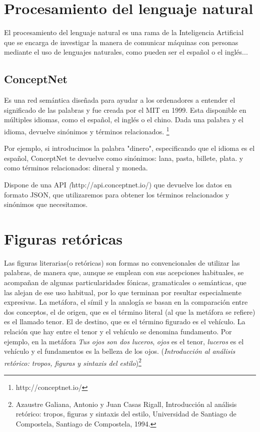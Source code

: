 \section{Procesamiento del lenguaje natural}
El procesamiento del lenguaje natural es una rama de la Inteligencia Artificial
que se encarga de investigar la manera de comunicar máquinas con personas mediante el uso de lenguajes naturales, como pueden ser el español o el inglés...

\subsection{ConceptNet} 

Es una red semántica diseñada para ayudar a los ordenadores a entender el significado de las palabras y fue creada por el MIT en 1999. Esta disponible en múltiples idiomas, como el español, el inglés o el chino.
Dada una palabra y el idioma, devuelve sinónimos y términos relacionados.
\footnote{http://conceptnet.io/}

Por ejemplo, si introducimos la palabra "dinero", especificando que el idioma es el español, ConceptNet te devuelve como sinónimos: lana, pasta, billete, plata. y como términos relacionados: dineral y moneda.

Dispone de una API \textit({http://api.conceptnet.io/}) que devuelve los datos en formato JSON, que utilizaremos para obtener los términos relacionados y sinónimos que necesitamos.

\section{Figuras retóricas}
Las figuras literarias(o retóricas) son formas no convencionales de utilizar las palabras, de manera que, aunque se emplean con sus acepciones habituales, se acompañan de algunas particularidades fónicas, gramaticales o semánticas, que las alejan de ese uso habitual, por lo que terminan por resultar especialmente expresivas. 
La metáfora, el símil y la analogía se basan en la comparación entre dos conceptos, el de origen, que es el término literal (al que la metáfora se refiere) es el llamado tenor. El de destino, que es el término figurado es el vehículo. La relación que hay entre el tenor y el vehículo se denomina fundamento. Por ejemplo, en la metáfora \textit{Tus ojos son dos luceros}, \textit{ojos} es el tenor, \textit{luceros} es el vehículo y el fundamentos es la belleza de los ojos.
(\textit {Introducción al análisis retórico: tropos, figuras y sintaxis del estilo})\footnote{Azaustre Galiana, Antonio y Juan Casas Rigall, Introducción al análisis retórico: tropos, figuras y sintaxis del estilo, Universidad de Santiago de Compostela, Santiago de Compostela, 1994.}


